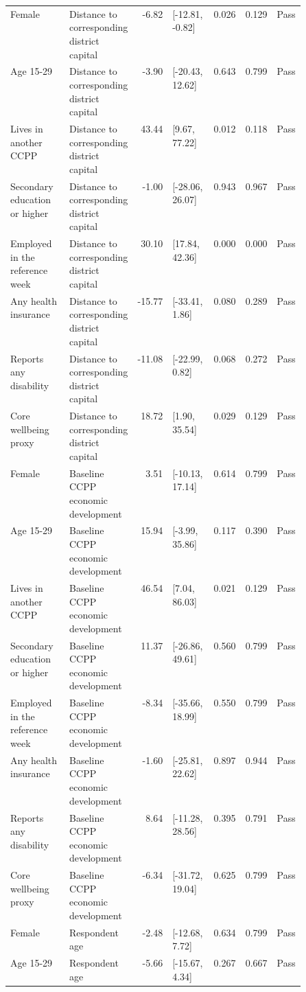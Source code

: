 \begin{longtable}{@{}p{0.20\linewidth}p{0.16\linewidth}rp{0.14\linewidth}rrl@{}}
Female & Distance to corresponding district capital & -6.82 & [-12.81, -0.82] & 0.026 & 0.129 & Pass \\
Age 15-29 & Distance to corresponding district capital & -3.90 & [-20.43, 12.62] & 0.643 & 0.799 & Pass \\
Lives in another CCPP & Distance to corresponding district capital & 43.44 & [9.67, 77.22] & 0.012 & 0.118 & Pass \\
Secondary education or higher & Distance to corresponding district capital & -1.00 & [-28.06, 26.07] & 0.943 & 0.967 & Pass \\
Employed in the reference week & Distance to corresponding district capital & 30.10 & [17.84, 42.36] & 0.000 & 0.000 & Pass \\
Any health insurance & Distance to corresponding district capital & -15.77 & [-33.41, 1.86] & 0.080 & 0.289 & Pass \\
Reports any disability & Distance to corresponding district capital & -11.08 & [-22.99, 0.82] & 0.068 & 0.272 & Pass \\
Core wellbeing proxy & Distance to corresponding district capital & 18.72 & [1.90, 35.54] & 0.029 & 0.129 & Pass \\
Female & Baseline CCPP economic development & 3.51 & [-10.13, 17.14] & 0.614 & 0.799 & Pass \\
Age 15-29 & Baseline CCPP economic development & 15.94 & [-3.99, 35.86] & 0.117 & 0.390 & Pass \\
Lives in another CCPP & Baseline CCPP economic development & 46.54 & [7.04, 86.03] & 0.021 & 0.129 & Pass \\
Secondary education or higher & Baseline CCPP economic development & 11.37 & [-26.86, 49.61] & 0.560 & 0.799 & Pass \\
Employed in the reference week & Baseline CCPP economic development & -8.34 & [-35.66, 18.99] & 0.550 & 0.799 & Pass \\
Any health insurance & Baseline CCPP economic development & -1.60 & [-25.81, 22.62] & 0.897 & 0.944 & Pass \\
Reports any disability & Baseline CCPP economic development & 8.64 & [-11.28, 28.56] & 0.395 & 0.791 & Pass \\
Core wellbeing proxy & Baseline CCPP economic development & -6.34 & [-31.72, 19.04] & 0.625 & 0.799 & Pass \\
Female & Respondent age & -2.48 & [-12.68, 7.72] & 0.634 & 0.799 & Pass \\
Age 15-29 & Respondent age & -5.66 & [-15.67, 4.34] & 0.267 & 0.667 & Pass \\

\end{longtable}
